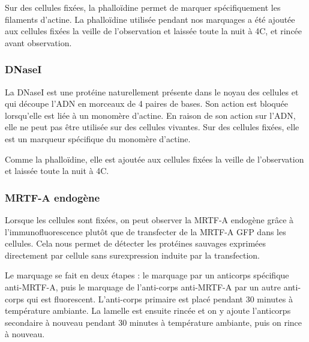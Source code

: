 \documentclass{report}
\begin{document}
		Sur des cellules fixées, la phalloïdine permet de marquer spécifiquement les filaments d'actine. La phalloïdine   utilisée pendant nos marquages a été ajoutée aux cellules fixées la veille de l'observation et laissée toute la nuit à 4\degres C, et rincée avant observation. 
		\subsubsection{DNaseI}
		La DNaseI est une protéine naturellement présente dans le noyau des cellules et qui découpe l'ADN en morceaux de 4 paires de bases. Son action est bloquée lorsqu'elle est liée à un monomère d'actine. En raison de son action sur l'ADN, elle ne peut pas être utilisée sur des cellules vivantes. Sur des cellules fixées, elle est un marqueur spécifique du monomère d'actine. 
		
		Comme la phalloïdine, elle est ajoutée aux cellules fixées la veille de l'observation et laissée toute la nuit à 4\degres   C. 
		\subsubsection{MRTF-A endogène}
		
		Lorsque les cellules sont fixées, on peut observer la MRTF-A endogène grâce à l'immunofluorescence plutôt que de transfecter de la MRTF-A GFP dans les cellules. Cela nous permet de détecter les protéines sauvages exprimées directement par cellule sans surexpression induite par la transfection. 
		
		Le marquage se fait en deux étapes : le marquage par un anticorps spécifique anti-MRTF-A, puis le marquage de l'anti-corps anti-MRTF-A par un autre anti-corps qui est fluorescent. L'anti-corps primaire est placé pendant 30 minutes à température ambiante. La lamelle est ensuite rincée et on y ajoute l'anticorps secondaire à nouveau pendant 30 minutes à température ambiante, puis on rince à nouveau. 
		 
\end{document}
